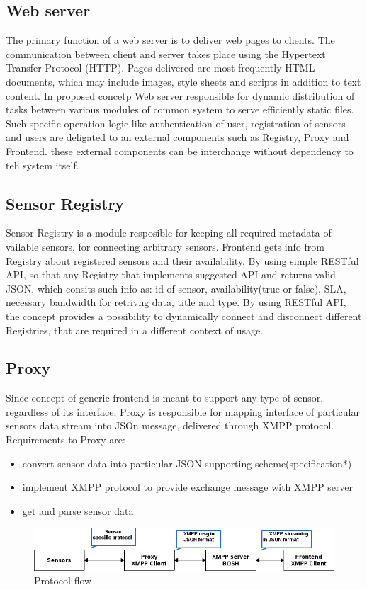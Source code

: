 	\subsection{Web server}
  The primary function of a web server is to deliver web pages to clients. The communication between client and server takes place using the Hypertext Transfer Protocol (HTTP). Pages delivered are most frequently HTML documents, which may include images, style sheets and scripts in addition to text content. 
  \newline In proposed concetp Web server responsible for dynamic distribution of tasks between various modules of common system to serve efficiently static files. Such specific operation logic like authentication of user, registration of sensors and users are deligated to an external components such as Registry, Proxy and Frontend. these external components can be interchange without dependency to teh system itself.

	\subsection{Sensor Registry}
  Sensor Registry is a module resposible for keeping all required metadata of vailable sensors, for connecting arbitrary sensors. Frontend gets info from Registry about registered sensors and their availability. By using simple RESTful API, so that any Registry that implements suggested API and returns valid JSON, which consits such info as: id of sensor, availability(true or false), SLA, necessary bandwidth for retrivng data, title and type. By using RESTful API, the concept provides a possibility to dynamically connect and disconnect different Registries, that are required in a different context of usage. 

	\subsection{Proxy}
  Since concept of generic frontend is meant to support any type of sensor, regardless of its interface, Proxy is responsible for mapping interface of particular sensors data stream into JSOn message, delivered through XMPP protocol. Requirements to Proxy are:
  \begin{itemize}
  \item convert sensor data into particular JSON supporting scheme(specification*)
  \item implement XMPP protocol to provide exchange message with XMPP server
  \item get and parse sensor data
  \end{itemize}
    \begin{figure}[!ht]
    \centering
    \includegraphics[scale=0.6]{images/Protocol_flow.png}   
    \caption[Protocol flow]{Protocol flow}
    \label{img:protocol}                           
    \end{figure}

